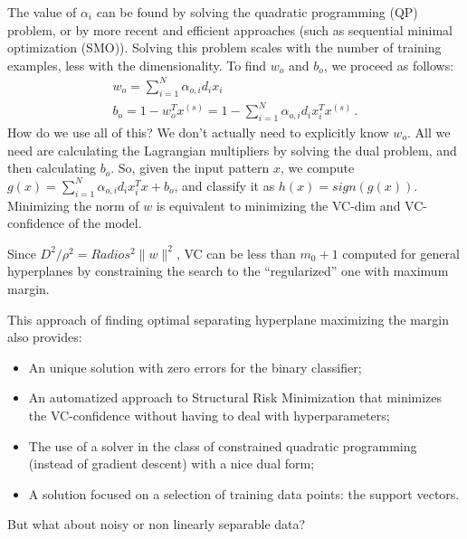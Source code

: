 The value of $\alpha_i$ can be found by solving the quadratic programming (QP) problem, or by more recent and efficient approaches (such as sequential minimal optimization (SMO)). Solving this problem scales with the number of training examples, less with the dimensionality. To find $w_o$ and $b_o$, we proceed as follows:
\begin{gather*}
    w_o = \sum_{i=1}^N \alpha_{o,i} d_i x_i \\
    b_o = 1 - w_o^T x^{(s)} = 1 - \sum_{i=1}^N \alpha_{o,i} d_i x_i^T x^{(s)} \, .
\end{gather*}
How do we use all of this? We don't actually need to explicitly know $w_o$. All we need are calculating the Lagrangian multipliers by solving the dual problem, and then calculating $b_o$. So, given the input pattern $x$, we compute $g(x) = \sum_{i=1}^N \alpha_{o,i} d_i x_i^T x + b_o$, and classify it as $h(x) = sign(g(x))$. Minimizing the norm of $w$ is equivalent to minimizing the VC-dim and VC-confidence of the model.

Since $D^2 / \rho^2 = Radios^2 \|w\|^2$, VC can be less than $m_0 + 1$ computed for general hyperplanes by constraining the search to the ``regularized'' one with maximum margin.

This approach of finding optimal separating hyperplane maximizing the margin also provides:
\begin{itemize}
    \item An unique solution with zero errors for the binary classifier;
    \item An automatized approach to Structural Risk Minimization that minimizes the VC-confidence without having to deal with hyperparameters;
    \item The use of a solver in the class of constrained quadratic programming (instead of gradient descent) with a nice dual form;
    \item A solution focused on a selection of training data points: the support vectors.
\end{itemize}
But what about noisy or non linearly separable data?

